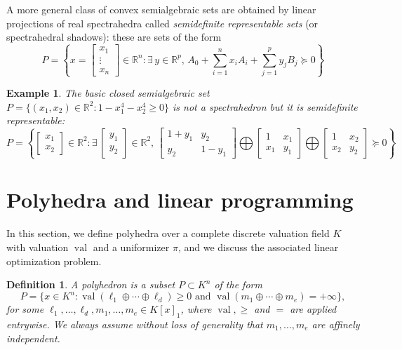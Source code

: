 \documentclass[a4paper,12pt]{article}
\newtheorem{definition}{Definition}
\newtheorem{example}{Example}
\newcommand{\R}{\mathbb{R}} %
\DeclareMathOperator{\val}{val}
\begin{document}
A more general class of convex semialgebraic sets are obtained by linear projections of real spectrahedra
called \emph{semidefinite representable sets} (or spectrahedral shadows): these are sets of the form
$$
P = \left\{x = \left[\begin{smallmatrix} x_1 \\ \vdots \\ x_n \end{smallmatrix}\right] \in \R^n : \exists\,y\in\R^p, \, A_0 + \sum_{i=1}^n x_i A_i + \sum_{j=1}^p y_j B_j \succeq 0\right\}
$$

\begin{example}
\label{fermat_quartic}
The basic closed semialgebraic set $P = \{(x_1,x_2) \in \R^2 : 1-x_1^4-x_2^4 \geq 0\}$ is not a spectrahedron
but it is semidefinite representable:
$$
P = \left\{\begin{bmatrix} x_1 \\ x_2 \end{bmatrix} \in \R^2 :
\exists\,
\begin{bmatrix} y_1 \\ y_2 \end{bmatrix} \in \R^2, \,
\begin{bmatrix}
  1+y_1 & y_2 \\
  y_2 & 1-y_1
\end{bmatrix}
\bigoplus
\begin{bmatrix}
  1 & x_1 \\
  x_1 & y_1
\end{bmatrix}
\bigoplus
\begin{bmatrix}
  1 & x_2 \\
  x_2 & y_2
\end{bmatrix}
\succeq 0
\right\}
$$
\end{example}


\section{Polyhedra and linear programming}

In this section, we define polyhedra over a complete discrete valuation field $K$ with valuation $\val$ and a uniformizer $\pi$, and we discuss the associated linear optimization problem.

\begin{definition}
  \label{def_polyhedra}
  A \emph{polyhedron} is a subset $P \subset K^n$ of the form
  $$
  P = \{x \in K^n : \val(\ell_1 \oplus \cdots \oplus \ell_d) \geq 0 \text{ and }
  \val(m_1 \oplus \cdots \oplus m_e) = +\infty\},
  $$
  for some $\ell_1,\ldots,\ell_d,m_1,\ldots,m_e \in K[x]_1$, where $\val,\geq$ and $=$ are applied entrywise.
  We always assume without loss of generality that $m_1,\ldots,m_e$ are affinely independent.
\end{definition}
\end{document}
